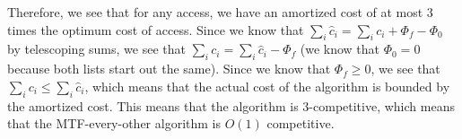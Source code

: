\documentclass[psamsfonts]{amsart}
\newenvironment{sol}{\vspace{0.25cm}{\large \bfseries Solution:}}{\qedsymbol}
\begin{document}
\begin{sol}
Therefore, we see that for any access, we have an amortized cost of at most 3 times the optimum cost of access. Since we know that $\sum_{i} \hat{c}_i = \sum_{i} c_i + \Phi_f - \Phi_0$ by telescoping sums, we see that $\sum_{i} c_i = \sum_{i} \hat{c}_i - \Phi_f$ (we know that $\Phi_0 = 0$ because both lists start out the same). Since we know that $\Phi_f \geq 0$, we see that $\sum_{i} c_i \leq \sum_{i} \hat{c}_i$, which means that the actual cost of the algorithm is bounded by the amortized cost. This means that the algorithm is 3-competitive, which means that the MTF-every-other algorithm is $O(1)$ competitive.
\end{sol}
\end{document}
